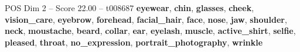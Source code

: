 \begin{textsample}{POS Dim 2 – Score 22.00 – t008687}  \label{ex:f2_pos_019}
\textbf{eyewear}, \textbf{chin}, \textbf{glasses}, \textbf{cheek}, \textbf{vision\_care}, \textbf{eyebrow}, \textbf{forehead}, \textbf{facial\_hair}, \textbf{face}, \textbf{nose}, \textbf{jaw}, \textbf{shoulder}, \textbf{neck}, \textbf{moustache}, \textbf{beard}, \textbf{collar}, \textbf{ear}, \textbf{eyelash}, \textbf{muscle}, \textbf{active\_shirt}, \textbf{selfie}, \textbf{pleased}, \textbf{throat}, \textbf{no\_expression}, \textbf{portrait\_photography}, \textbf{wrinkle}

\end{textsample}
